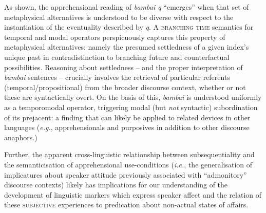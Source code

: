 As shown, the apprehensional reading of \textit{bambai q} ``emerges'' when that set of metaphysical alternatives is understood to be diverse with respect to the instantiation of the eventuality described by \textit{q}. A \textsc{branching time} semantics for temporal and modal operators perspicuously captures this property of metaphysical alternatives: namely the presumed settledness of a given index's unique past in contradistinction to branching future and counterfactual possibilities. Reasoning about settledness -- and the proper interpretation of \textit{bambai} sentences -- crucially involves the retrieval of particular referents (temporal/propositional) from the broader discourse context, whether or not these are syntactically overt. On the basis of this, \textit{bambai} is understood uniformly as a temporomodal operator, triggering modal (but \textit{not} syntactic) subordination of its prejacent: a finding that can likely be applied to related devices in other languages (\textit{e.g.}, apprehensionals and purposives in addition to other discourse anaphors.)

Further, the apparent cross-linguistic relationship between subsequentiality  and the semanticisation of apprehensional use-conditions (\textit{i.e.}, the generalisation of implicatures about speaker attitude previously associated with ``admonitory'' discourse contexts) likely has implications for our understanding of the development of linguistic markers which express speaker affect and the relation of these \textsc{subjective} experiences to predication about non-actual states of affairs.




